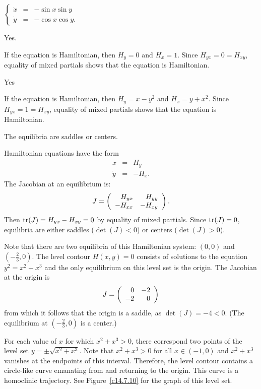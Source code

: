  \ans $\left\{\begin{array}{rcl}
\dot{x} & = & -\sin x\sin y \\ \dot{y} & = & -\cos x\cos y. \end{array}\right.$

 \ans Yes.

\soln If the equation is Hamiltonian, then $H_y=0$ and $H_x=1$.  Since 
$H_{yx}=0=H_{xy}$, equality of mixed partials shows that the equation is
Hamiltonian.

 \ans Yes

\soln  If the equation is Hamiltonian, then $H_y=x-y^2$ and $H_x=y+x^2$.  
Since $H_{yx}=1=H_{xy}$, equality of mixed partials shows that the equation 
is Hamiltonian.

 \ans The equilibria are saddles or centers.

\soln  Hamiltonian equations have the form 
\begin{eqnarray*}
\dot{x} & = & H_y \\
\dot{y} & = & -H_x.
\end{eqnarray*}
The Jacobian at an equilibrium is:
\[
J = \left(\begin{array}{rr} H_{yx} & H_{yy}\\ -H_{xx} &-H_{xy}\end{array}\right).
\]
Then ${\rm tr}(J)=H_{yx}-H_{xy}=0$ by equality of mixed partials.  Since 
${\rm tr}(J)=0$, equilibria are either saddles ($\det(J)<0$) or centers
($\det(J)>0$).

Note that there are two equilibria of this Hamiltonian system: $(0,0)$ and
$(-\frac{2}{3},0)$.  The level contour $H(x,y)=0$ consists of solutions to 
the equation $y^2=x^2+x^3$ and the only equilibrium on this level set is the
origin.  The Jacobian at the origin is
\[
J = \left(\begin{array}{rr} 0 & -2\\ -2 &0\end{array}\right)
\]
from which it follows that the origin is a saddle, as $\det(J)=-4<0$. (The
equilibrium at $(-\frac{2}{3},0)$ is a center.)

For each value of $x$ for which $x^2+x^3>0$, there correspond two points of
the level set $y=\pm\sqrt{x^2+x^3}$.  Note that $x^2+x^3>0$ for all 
$x\in(-1,0)$ and $x^2+x^3$ vanishes at the endpoints of this interval. 
Therefore, the level contour contains a circle-like curve emanating from and
returning to the origin.  This curve is a homoclinic trajectory.  See
Figure~\ref{c14.7.10} for the graph of this level set.
 
\begin{figure}[htb]
     \centerline{%
     }
\end{figure} 

 